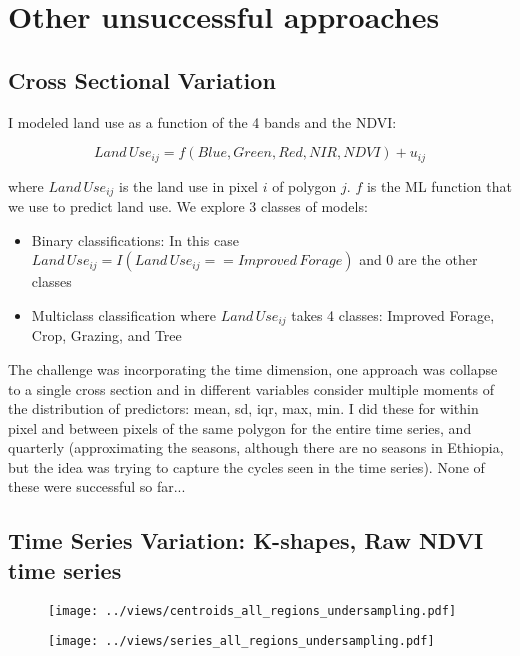 \documentclass[10pt,a4paper,onecolumn]{article}
\begin{document}
\pagebreak



\section{Other unsuccessful approaches}

\subsection{Cross Sectional Variation}

I modeled land use as a function of the 4 bands and the NDVI:


$$Land\,Use_{ij} = f(Blue,Green,Red,NIR,NDVI) + u_{ij}$$

where $Land\,Use_{ij}$ is the land use in pixel $i$ of polygon $j$. $f$ is the ML function that we use to predict land use. We explore 3 classes of models:

\begin{itemize}
  \item Binary classifications: In this case $Land\,Use_{ij}=I(Land\,Use_{ij}==Improved\,Forage)$ and 0 are the other classes
  \item Multiclass classification where $Land\,Use_{ij}$ takes 4 classes: Improved Forage, Crop, Grazing, and Tree
\end{itemize}

The challenge was incorporating the time dimension, one approach was collapse to a single cross section and in different variables consider multiple moments  of the distribution of predictors: mean, sd, iqr, max, min. I did these for within pixel and between pixels of the same polygon for the entire time series, and quarterly (approximating the seasons, although there are no seasons in Ethiopia, but the idea was trying to capture the cycles seen in the time series).
None of these were successful so far...



\subsection{Time Series Variation: K-shapes, Raw NDVI time series}



  \begin{figure}[H] \centering
            \captionsetup{justification=centering}
              \texttt{[image: ../views/centroids\_all\_regions\_undersampling.pdf]}
              
 \end{figure}


  \begin{figure}[H] \centering
            \captionsetup{justification=centering}
              \texttt{[image: ../views/series\_all\_regions\_undersampling.pdf]}
              
 \end{figure}

 

\end{document}
